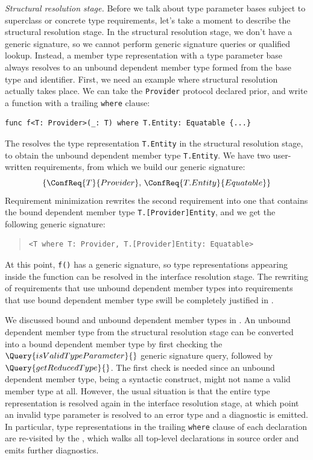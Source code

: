 \documentclass[../generics]{subfiles}
\begin{document}
\emph{Structural resolution stage.} Before we talk about type parameter bases subject to superclass or concrete type requirements, let's take a moment to describe the structural resolution stage. In the structural resolution stage, we don't have a generic signature, so we cannot perform generic signature queries or qualified lookup. Instead, a member type representation with a type parameter base always resolves to an unbound dependent member type formed from the base type and identifier. First, we need an example where structural resolution actually takes place. We can take the \texttt{Provider} protocol declared prior, and write a function with a trailing \texttt{where} clause:
\begin{Verbatim}
func f<T: Provider>(_: T) where T.Entity: Equatable {...}
\end{Verbatim}
The  resolves the type representation \texttt{T.Entity} in the structural resolution stage, to obtain the unbound dependent member type \texttt{T.Entity}. We have two user-written requirements, from which we build our generic signature:
\[\{\ConfReq{T}{Provider},\,\ConfReq{T.Entity}{Equatable}\}\]
Requirement minimization rewrites the second requirement into one that contains the bound dependent member type \texttt{T.[Provider]Entity}, and we get the following generic signature:
\begin{quote}
\begin{verbatim}
<T where T: Provider, T.[Provider]Entity: Equatable>
\end{verbatim}
\end{quote}
At this point, \texttt{f()} has a generic signature, so type representations appearing inside the function can be resolved in the interface resolution stage. The rewriting of requirements that use unbound dependent member types into requirements that use bound dependent member type swill be completely justified in .

We discussed bound and unbound dependent member types in . An unbound dependent member type from the structural resolution stage can be converted into a bound dependent member type by first checking the $\Query{isValidTypeParameter}{}$ generic signature query, followed by $\Query{getReducedType}{}$. The first check is needed since an unbound dependent member type, being a syntactic construct, might not name a valid member type at all. However, the usual situation is that the entire type representation is resolved again in the interface resolution stage, at which point an invalid type parameter is resolved to an error type and a diagnostic is emitted. In particular, type representations in the trailing \texttt{where} clause of each declaration are re-visited by the , which walks all top-level declarations in source order and emits further diagnostics.
\end{document}
